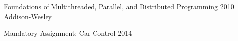 
\begingroup
\begin{thebibliography}{99}

  {Foundations of Multithreaded, Parallel, and Distributed Programming}
  {2010}
  {Addison-Wesley}

  {Mandatory Assignment: Car Control}
  {2014}

\end{thebibliography}
\endgroup
